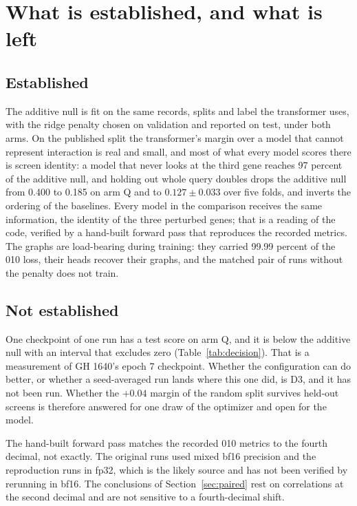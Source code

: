 
\section{What is established, and what is left}
\label{sec:remaining}

\subsection{Established}

The additive null is fit on the same records, splits and label the transformer
uses, with the ridge penalty chosen on validation and reported on test, under both
arms. On the published split the transformer's margin over a model that cannot
represent interaction is real and small, and most of what every model scores there
is screen identity: a model that never looks at the third gene reaches 97 percent
of the additive null, and holding out whole query doubles drops the additive null
from 0.400 to 0.185 on arm Q and to $0.127 \pm 0.033$ over five folds, and inverts
the ordering of the baselines.\iflong{} Every model in the comparison receives the
same information, the identity of the three perturbed genes; that is a reading of
the code, verified by a hand-built forward pass that reproduces the recorded
metrics. The graphs are load-bearing during training: they carried 99.99 percent of
the 010 loss, their heads recover their graphs, and the matched pair of runs without
the penalty does not train.\fi

\subsection{Not established}

One checkpoint of one run has a test score on arm Q, and it is below the additive
null with an interval that excludes zero (Table~\ref{tab:decision}). That is a
measurement of GH 1640's epoch 7 checkpoint. Whether the configuration can do
better, or whether a seed-averaged run lands where this one did, is D3, and it has
not been run. Whether the $+0.04$ margin of the random split survives held-out
screens is therefore answered for one draw of the optimizer and open for the
model.

\iflong
{}
The hand-built forward pass matches the recorded 010 metrics to the fourth decimal,
not exactly. The original runs used mixed bf16 precision and the reproduction runs
in fp32, which is the likely source and has not been verified by rerunning in
bf16. The conclusions of Section~\ref{sec:paired} rest on correlations at the
second decimal and are not sensitive to a fourth-decimal shift.

